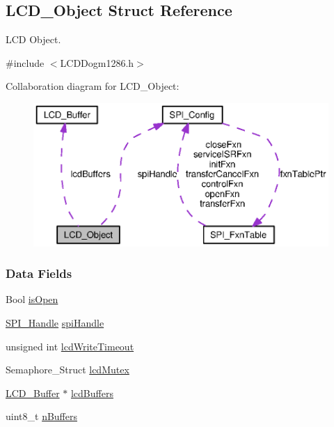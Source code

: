 \subsection{L\-C\-D\-\_\-\-Object Struct Reference}
\label{struct_l_c_d___object}


L\-C\-D Object.  




{\ttfamily \#include $<$L\-C\-D\-Dogm1286.\-h$>$}



Collaboration diagram for L\-C\-D\-\_\-\-Object\-:
\nopagebreak
\begin{figure}[H]
\begin{center}
\leavevmode
\includegraphics[width=350pt]{struct_l_c_d___object__coll__graph}
\end{center}
\end{figure}
\subsubsection*{Data Fields}
\begin{DoxyCompactItemize}
\item 
Bool \hyperlink{struct_l_c_d___object_a694bdda5d369af24f065f697b95cc41f}{is\-Open}
\item 
\hyperlink{_s_p_i_8h_a728806534c3c3e8675cfbfb7d8e36f13}{S\-P\-I\-\_\-\-Handle} \hyperlink{struct_l_c_d___object_ae5a83e239d37d34cf7c111cb879ab237}{spi\-Handle}
\item 
unsigned int \hyperlink{struct_l_c_d___object_acb3f2edac00d7ef0a0cf2dc9b0ba3160}{lcd\-Write\-Timeout}
\item 
Semaphore\-\_\-\-Struct \hyperlink{struct_l_c_d___object_a39cc695912368d6f9c72ba51fa34719e}{lcd\-Mutex}
\item 
\hyperlink{struct_l_c_d___buffer}{L\-C\-D\-\_\-\-Buffer} $\ast$ \hyperlink{struct_l_c_d___object_acf7322679a62a6a8f0d0c26363d33696}{lcd\-Buffers}
\item 
uint8\-\_\-t \hyperlink{struct_l_c_d___object_aaedc411a324d3ada993422793871a919}{n\-Buffers}
\end{DoxyCompactItemize}


